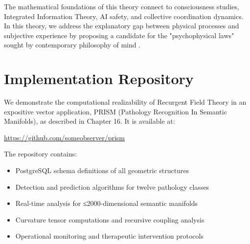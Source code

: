 \documentclass[11pt, a4paper]{report}
\begin{document}
\vspace{1em}

The mathematical foundations of this theory connect to consciousness studies, Integrated Information Theory, AI safety, and collective coordination dynamics. In this theory, we address the explanatory gap between physical processes and subjective experience by proposing a candidate for the "psychophysical laws" sought by contemporary philosophy of mind \autocite{Chalmers1996}.

\tableofcontents


















\appendix
\chapter{Implementation Repository}
\label{appendix:implementation}

We demonstrate the computational realizability of Recurgent Field Theory in an expositive vector application, PRISM (Pathology Recognition In Semantic Manifolds), as described in Chapter 16. It is available at:

\begin{center}
\url{https://github.com/someobserver/prism}
\end{center}

The repository contains:
\begin{itemize}
\item PostgreSQL schema definitions of all geometric structures
\item Detection and prediction algorithms for twelve pathology classes
\item Real-time analysis for ≤2000-dimensional semantic manifolds
\item Curvature tensor computations and recursive coupling analysis
\item Operational monitoring and therapeutic intervention protocols
\end{itemize}
\end{document}
